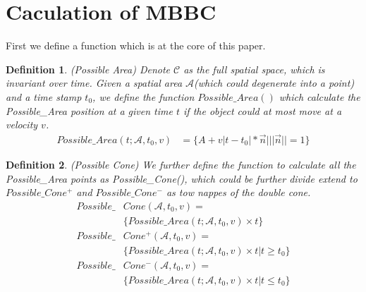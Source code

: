 \documentclass[sigplan]{acmart}
\newtheorem{myDef}{Definition}
\begin{document}
\section{Caculation of MBBC}
First we define a function which is at the core of this paper.
\begin{myDef}
  (Possible Area) Denote $\mathcal{C}$ as the full spatial space, which is invariant over time. Given a spatial area $\mathcal{A}$(which could degenerate into a point) and a time stamp $t_0$, we define the function $Possible\_Area()$ which calculate the Possible\_Area position at a given time $t$ if the object could at most move at a velocity $v$.
  $$
  \begin{aligned}
  Possible\_Area(t;\mathcal{A},t_0,v)&= \{A+v|t-t_0|*\vec{n} \big| ||\vec{n}||=1\}
  \end{aligned}
  $$
\end{myDef}
\begin{myDef}
  (Possible Cone) We further define the function to calculate all the Possible\_Area points as Possible\_Cone(), which could be further divide extend to $Possible\_Cone^+$ and $Possible\_Cone^-$ as tow nappes of the double cone.
  $$
  \begin{aligned}
  Possible\_&Cone(\mathcal{A},t_0,v)=\\
  &\{Possible\_Area(t;\mathcal{A},t_0,v)\times t\}\\
  Possible\_&Cone^+(\mathcal{A},t_0,v)=\\
  &\{Possible\_Area(t;\mathcal{A},t_0,v)\times t \big| t\geq t_0\}\\
  Possible\_&Cone^-(\mathcal{A},t_0,v)=\\
  &\{Possible\_Area(t;\mathcal{A},t_0,v)\times t \big| t\leq t_0\}
  \end{aligned}
  $$
\end{myDef}
\end{document}
